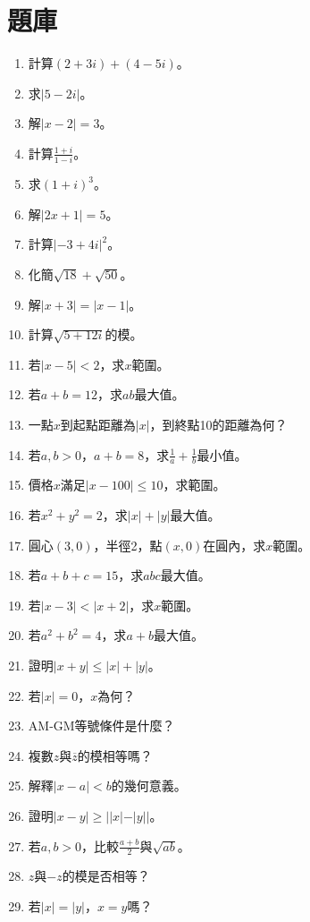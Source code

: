 \section{題庫}
\begin{enumerate}[label=\arabic*.]
    \item 計算$(2 + 3i) + (4 - 5i)$。
    \item 求$|5 - 2i|$。
    \item 解$|x - 2| = 3$。
    \item 計算$\frac{1 + i}{1 - i}$。
    \item 求$(1 + i)^3$。
    \item 解$|2x + 1| = 5$。
    \item 計算$|-3 + 4i|^2$。
    \item 化簡$\sqrt{18} + \sqrt{50}$。
    \item 解$|x + 3| = |x - 1|$。
    \item 計算$\sqrt{5 + 12i}$的模。
    \item 若$|x - 5| < 2$，求$x$範圍。
    \item 若$a + b = 12$，求$ab$最大值。
    \item 一點$x$到起點距離為$|x|$，到終點10的距離為何？
    \item 若$a, b > 0$，$a + b = 8$，求$\frac{1}{a} + \frac{1}{b}$最小值。
    \item 價格$x$滿足$|x - 100| \leq 10$，求範圍。
    \item 若$x^2 + y^2 = 2$，求$|x| + |y|$最大值。
    \item 圓心$(3, 0)$，半徑2，點$(x, 0)$在圓內，求$x$範圍。
    \item 若$a + b + c = 15$，求$abc$最大值。
    \item 若$|x - 3| < |x + 2|$，求$x$範圍。
    \item 若$a^2 + b^2 = 4$，求$a + b$最大值。
    \item 證明$|x + y| \leq |x| + |y|$。
    \item 若$|x| = 0$，$x$為何？
    \item AM-GM等號條件是什麼？
    \item 複數$z$與$\overline{z}$的模相等嗎？
    \item 解釋$|x - a| < b$的幾何意義。
    \item 證明$|x - y| \geq ||x| - |y||$。
    \item 若$a, b > 0$，比較$\frac{a + b}{2}$與$\sqrt{ab}$。
    \item $z$與$-z$的模是否相等？
    \item 若$|x| = |y|$，$x = y$嗎？

\end{enumerate}

